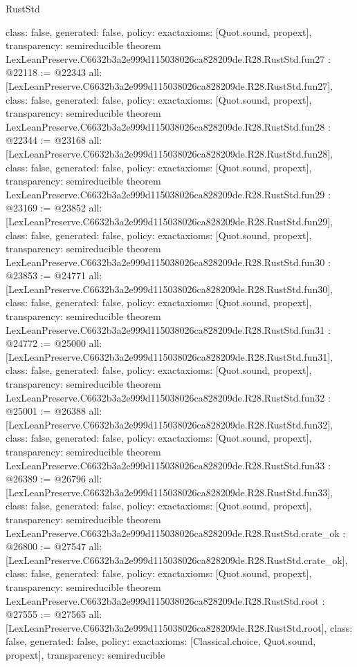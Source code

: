 \begin{lexlean}{RustStd}
\begin{coremodule}
{  class: false,
  generated: false,
  policy: exact{axioms: [Quot.sound, propext]},
  transparency: semireducible
}
theorem LexLeanPreserve.C6632b3a2e999d115038026ca828209de.R28.RustStd.fun27 : @22118 := @22343 {
  all: [LexLeanPreserve.C6632b3a2e999d115038026ca828209de.R28.RustStd.fun27],
  class: false,
  generated: false,
  policy: exact{axioms: [Quot.sound, propext]},
  transparency: semireducible
}
theorem LexLeanPreserve.C6632b3a2e999d115038026ca828209de.R28.RustStd.fun28 : @22344 := @23168 {
  all: [LexLeanPreserve.C6632b3a2e999d115038026ca828209de.R28.RustStd.fun28],
  class: false,
  generated: false,
  policy: exact{axioms: [Quot.sound, propext]},
  transparency: semireducible
}
theorem LexLeanPreserve.C6632b3a2e999d115038026ca828209de.R28.RustStd.fun29 : @23169 := @23852 {
  all: [LexLeanPreserve.C6632b3a2e999d115038026ca828209de.R28.RustStd.fun29],
  class: false,
  generated: false,
  policy: exact{axioms: [Quot.sound, propext]},
  transparency: semireducible
}
theorem LexLeanPreserve.C6632b3a2e999d115038026ca828209de.R28.RustStd.fun30 : @23853 := @24771 {
  all: [LexLeanPreserve.C6632b3a2e999d115038026ca828209de.R28.RustStd.fun30],
  class: false,
  generated: false,
  policy: exact{axioms: [Quot.sound, propext]},
  transparency: semireducible
}
theorem LexLeanPreserve.C6632b3a2e999d115038026ca828209de.R28.RustStd.fun31 : @24772 := @25000 {
  all: [LexLeanPreserve.C6632b3a2e999d115038026ca828209de.R28.RustStd.fun31],
  class: false,
  generated: false,
  policy: exact{axioms: [Quot.sound, propext]},
  transparency: semireducible
}
theorem LexLeanPreserve.C6632b3a2e999d115038026ca828209de.R28.RustStd.fun32 : @25001 := @26388 {
  all: [LexLeanPreserve.C6632b3a2e999d115038026ca828209de.R28.RustStd.fun32],
  class: false,
  generated: false,
  policy: exact{axioms: [Quot.sound, propext]},
  transparency: semireducible
}
theorem LexLeanPreserve.C6632b3a2e999d115038026ca828209de.R28.RustStd.fun33 : @26389 := @26796 {
  all: [LexLeanPreserve.C6632b3a2e999d115038026ca828209de.R28.RustStd.fun33],
  class: false,
  generated: false,
  policy: exact{axioms: [Quot.sound, propext]},
  transparency: semireducible
}
theorem LexLeanPreserve.C6632b3a2e999d115038026ca828209de.R28.RustStd.crate_ok : @26800 := @27547 {
  all: [LexLeanPreserve.C6632b3a2e999d115038026ca828209de.R28.RustStd.crate_ok],
  class: false,
  generated: false,
  policy: exact{axioms: [Quot.sound, propext]},
  transparency: semireducible
}
theorem LexLeanPreserve.C6632b3a2e999d115038026ca828209de.R28.RustStd.root : @27555 := @27565 {
  all: [LexLeanPreserve.C6632b3a2e999d115038026ca828209de.R28.RustStd.root],
  class: false,
  generated: false,
  policy: exact{axioms: [Classical.choice, Quot.sound, propext]},
  transparency: semireducible
}


\end{coremodule}
\end{lexlean}
